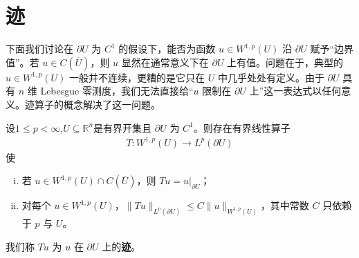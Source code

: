 \documentclass[../../main.tex]{subfiles}
\begin{document}
\section{迹}\label{section:ch08-变分法}

下面我们讨论在 $\partial U$ 为 $C^{1}$ 的假设下，能否为函数 $u\in W^{1,p}(U)$ 沿 $\partial U$ 赋予“边界值”。若 $u\in C(\overline{U})$，则 $u$ 显然在通常意义下在 $\partial U$ 上有值。问题在于，典型的 $u\in W^{1,p}(U)$ 一般并不连续，更糟的是它只在 $U$ 中几乎处处有定义。由于 $\partial U$ 具有 $n$ 维 Lebesgue 零测度，我们无法直接给“$u$ 限制在 $\partial U$ 上”这一表达式以任何意义。迹算子的概念解决了这一问题。

\begin{theorem}[迹定理]\label{theorem:ch05-迹定理}
设$1\leqslant p<\infty$,$U\subseteq \mathbb{R}^n$是有界开集且 $\partial U$ 为 $C^{1}$。则存在有界线性算子
\begin{align*}
T:W^{1,p}(U)\to L^{p}(\partial U)
\end{align*}
使
\begin{enumerate}[(i)]
\item 若 $u\in W^{1,p}(U)\cap C(\overline{U})$，则 $Tu=u|_{\partial U}$；

\item 对每个 $u\in W^{1,p}(U)$，$\|Tu\|_{L^{p}(\partial U)}\leqslant C\|u\|_{W^{1,p}(U)}$，其中常数 $C$ 只依赖于 $p$ 与 $U$。
\end{enumerate}
我们称 $Tu$ 为 $u$ 在 $\partial U$ 上的\textbf{迹}。
\end{theorem}
\end{document}
